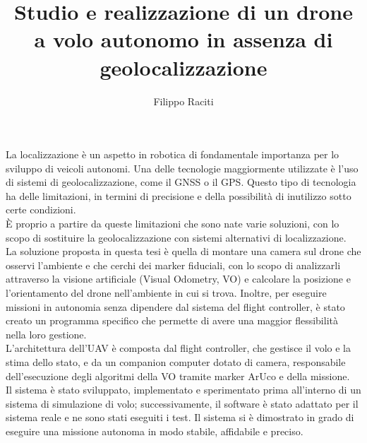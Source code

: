 \documentclass[12pt]{report}
\title{Studio e realizzazione di un drone a volo autonomo in assenza di geolocalizzazione}
\author{Filippo Raciti}
\begin{document}
\makefrontpage

% 
%



% 
%


%
%

La localizzazione è un aspetto in robotica di fondamentale importanza per lo sviluppo di veicoli autonomi. Una delle tecnologie maggiormente utilizzate è l'uso di sistemi di geolocalizzazione, come il GNSS o il GPS. Questo tipo di tecnologia ha delle limitazioni, in termini di precisione e della possibilità di inutilizzo sotto certe condizioni. \\
È proprio a partire da queste limitazioni che sono nate varie soluzioni, con lo scopo di sostituire la geolocalizzazione con sistemi alternativi di localizzazione. \\
La soluzione proposta in questa tesi è quella di montare una camera sul drone che osservi l'ambiente e che cerchi dei marker fiduciali, con lo scopo di analizzarli attraverso la visione artificiale (Visual Odometry, VO) e calcolare la posizione e l'orientamento del drone nell'ambiente in cui si trova. Inoltre, per eseguire missioni in autonomia senza dipendere dal sistema del flight controller, è stato creato un programma specifico che permette di avere una maggior flessibilità nella loro gestione.\\
L'architettura dell'UAV è composta dal flight controller, che gestisce il volo e la stima dello stato, e da un companion computer dotato di camera, responsabile dell'esecuzione degli algoritmi della VO tramite marker ArUco e della missione.\\
Il sistema è stato sviluppato, implementato e sperimentato prima all'interno di un sistema di simulazione di volo; successivamente, il software è stato adattato per il sistema reale e ne sono stati eseguiti i test. Il sistema si è dimostrato in grado di eseguire una missione autonoma in modo stabile, affidabile e preciso.
\end{document}
